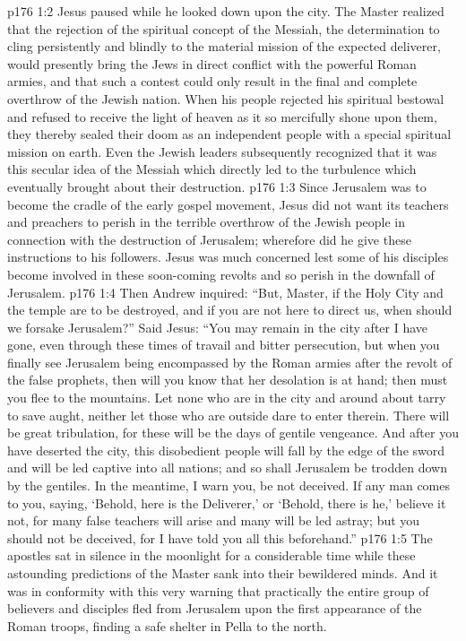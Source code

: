 \vs p176 1:2 Jesus paused while he looked down upon the city. The Master realized that the rejection of the spiritual concept of the Messiah, the determination to cling persistently and blindly to the material mission of the expected deliverer, would presently bring the Jews in direct conflict with the powerful Roman armies, and that such a contest could only result in the final and complete overthrow of the Jewish nation. When his people rejected his spiritual bestowal and refused to receive the light of heaven as it so mercifully shone upon them, they thereby sealed their doom as an independent people with a special spiritual mission on earth. Even the Jewish leaders subsequently recognized that it was this secular idea of the Messiah which directly led to the turbulence which eventually brought about their destruction.\plusone
\vs p176 1:3 Since Jerusalem was to become the cradle of the early gospel movement, Jesus did not want its teachers and preachers to perish in the terrible overthrow of the Jewish people in connection with the destruction of Jerusalem; wherefore did he give these instructions to his followers. Jesus was much concerned lest some of his disciples become involved in these soon\hyp{}coming revolts and so perish in the downfall of Jerusalem.
\vs p176 1:4 Then Andrew inquired: “But, Master, if the Holy City and the temple are to be destroyed, and if you are not here to direct us, when should we forsake Jerusalem?” Said Jesus: \textcolor{ubdarkred}{“You may remain in the city after I have gone, even through these times of travail and bitter persecution, but when you finally see Jerusalem being encompassed by the Roman armies after the revolt of the false prophets, then will you know that her desolation is at hand; then must you flee to the mountains. Let none who are in the city and around about tarry to save aught, neither let those who are outside dare to enter therein. There will be great tribulation, for these will be the days of gentile vengeance. And after you have deserted the city, this disobedient people will fall by the edge of the sword and will be led captive into all nations; and so shall Jerusalem be trodden down by the gentiles. In the meantime, I warn you, be not deceived. If any man comes to you, saying, ‘Behold, here is the Deliverer,’ or ‘Behold, there is he,’ believe it not, for many false teachers will arise and many will be led astray; but you should not be deceived, for I have told you all this beforehand.”}
\vs p176 1:5 The apostles sat in silence in the moonlight for a considerable time while these astounding predictions of the Master sank into their bewildered minds. And it was in conformity with this very warning that practically the entire group of believers and disciples fled from Jerusalem upon the first appearance of the Roman troops, finding a safe shelter in Pella to the north.
